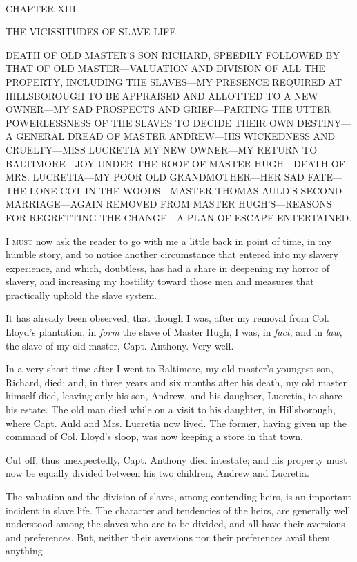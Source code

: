 {\protect\hypertarget{173}{}{}}

~

{CHAPTER XIII.}

THE VICISSITUDES OF SLAVE LIFE.

{DEATH OF OLD MASTER'S SON RICHARD, SPEEDILY FOLLOWED BY THAT OF OLD
MASTER---VALUATION AND DIVISION OF ALL THE PROPERTY, INCLUDING THE
SLAVES---MY PRESENCE REQUIRED AT HILLSBOROUGH TO BE APPRAISED AND
ALLOTTED TO A NEW OWNER---MY SAD PROSPECTS AND GRIEF---PARTING THE UTTER
POWERLESSNESS OF THE SLAVES TO DECIDE THEIR OWN DESTINY---A GENERAL
DREAD OF MASTER ANDREW---HIS WICKEDNESS AND CRUELTY---MISS LUCRETIA MY
NEW OWNER---MY RETURN TO BALTIMORE---JOY UNDER THE ROOF OF MASTER
HUGH---DEATH OF MRS. LUCRETIA---MY POOR OLD GRANDMOTHER---HER SAD
FATE---THE LONE COT IN THE WOODS---MASTER THOMAS AULD'S SECOND
MARRIAGE---AGAIN REMOVED FROM MASTER HUGH'S---REASONS FOR REGRETTING THE
CHANGE---A PLAN OF ESCAPE ENTERTAINED.}

\textsc{I must} now ask the reader to go with me a little back in point
of time, in my humble story, and to notice another circumstance that
entered into my slavery experience, and which, doubtless, has had a
share in deepening my horror of slavery, and increasing my hostility
toward those men and measures that practically uphold the slave system.

It has already been observed, that though I was, after my removal from
Col. Lloyd's plantation, in \emph{form} the slave of Master Hugh, I was,
in \emph{fact}, and in \emph{law}, the slave of my old master, Capt.
Anthony. Very well.

In a very short time after I went to Baltimore, my old master's youngest
son, Richard, died; and, in {\protect\hypertarget{174}{}{}}three years
and six months after his death, my old master himself died, leaving only
his son, Andrew, and his daughter, Lucretia, to share his estate. The
old man died while on a visit to his daughter, in Hillsborough, where
Capt. Auld and Mrs. Lucretia now lived. The former, having given up the
command of Col. Lloyd's sloop, was now keeping a store in that town.

Cut off, thus unexpectedly, Capt. Anthony died intestate; and his
property must now be equally divided between his two children, Andrew
and Lucretia.

The valuation and the division of slaves, among contending heirs, is an
important incident in slave life. The character and tendencies of the
heirs, are generally well understood among the slaves who are to be
divided, and all have their aversions and preferences. But, neither
their aversions nor their preferences avail them anything.

